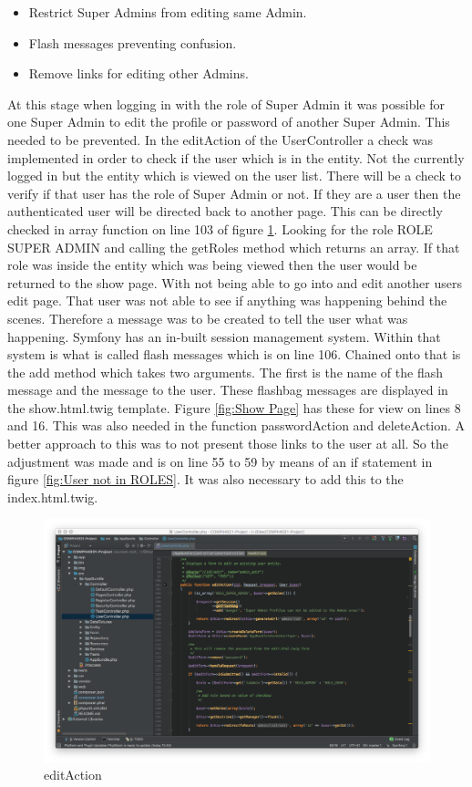\begin{itemize}
  \item Restrict Super Admins from editing same Admin.
    \item Flash messages preventing confusion.
      \item Remove links for editing other Admins.
\end{itemize}

At this stage when logging in with the role of Super Admin it was possible for one Super Admin to edit the profile or password of another Super Admin. This needed to be prevented. In the editAction of the UserController a check was implemented in order to check if the user which is in the entity. Not the currently logged in but the entity which is viewed on the user list. There will be a check to verify if that user has the role of Super Admin or not. If they are a user then the authenticated user will be directed back to another page. This can be directly checked in array function on line 103 of figure \ref{fig:editAction}. Looking for the role ROLE SUPER ADMIN and calling the getRoles method which returns an array. If that role was inside the entity which was being viewed then the user would be returned to the show page. With not being able to go into and edit another users edit page. That user was not able to see if anything was happening behind the scenes. Therefore a message was to be created to tell the user what was happening. Symfony has an in-built session management system. Within that system is what is called flash messages which is on line 106. Chained onto that is the add method which takes two arguments. The first is the name of the flash message and the message to the user. These flashbag messages are displayed in the show.html.twig template. Figure \ref{fig:Show Page} has these for view on lines 8 and 16. This was also needed in the function passwordAction and deleteAction. A better approach to this was to not present those links to the user at all. So the adjustment was made and is on line 55 to 59 by means of an if statement in figure \ref{fig:User not in ROLES}. It was also necessary to add this to the index.html.twig.

\begin{figure}[htbp]
   \centering
   \includegraphics[width=400pt]{figures/edit_action.png} %
   \caption{editAction}
   \label{fig:editAction}
\end{figure}

